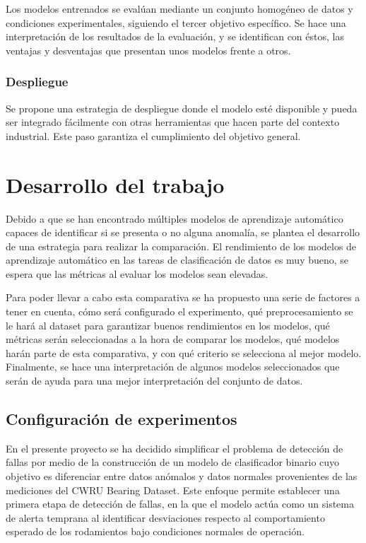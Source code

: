\documentclass[11pt,a4paper,spanish]{book}
\numberwithin{equation}{chapter}
\numberwithin{figure}{chapter}
\begin{document}
Los modelos entrenados se evalúan mediante un conjunto homogéneo de datos y condiciones 
experimentales, siguiendo el tercer objetivo específico. Se hace una interpretación de 
los resultados de la evaluación, y se identifican con éstos, las ventajas y desventajas 
que presentan unos modelos frente a otros. 


\subsection{Despliegue}

Se propone una estrategia de despliegue donde el modelo esté disponible y pueda ser 
integrado fácilmente con otras herramientas que hacen parte del contexto industrial. 
Este paso garantiza el cumplimiento del objetivo general. 



\chapter{Desarrollo del trabajo}

Debido a que se han encontrado múltiples modelos de aprendizaje automático capaces de 
identificar si se presenta o no alguna anomalía, se plantea el desarrollo de una 
estrategia para realizar la comparación. El rendimiento de los modelos de aprendizaje 
automático en las tareas de clasificación de datos es muy bueno, se espera que las 
métricas al evaluar los modelos sean elevadas. 


Para poder llevar a cabo esta comparativa se ha propuesto una serie de factores a tener 
en cuenta, cómo será configurado el experimento, qué preprocesamiento se le hará al 
dataset para garantizar buenos rendimientos en los modelos, qué métricas serán 
seleccionadas a la hora de comparar los modelos, qué modelos harán parte de esta 
comparativa, y con qué criterio se selecciona al mejor modelo. Finalmente, se hace una 
interpretación de algunos modelos seleccionados que serán de ayuda para una mejor 
interpretación del conjunto de datos. 


\section{Configuración de experimentos}

En el presente proyecto se ha decidido simplificar el problema de detección de fallas 
por medio de la construcción de un modelo de clasificador binario cuyo objetivo es 
diferenciar entre datos anómalos y datos normales provenientes de las mediciones del 
CWRU Bearing Dataset. Este enfoque permite establecer una primera etapa de detección de 
fallas, en la que el modelo actúa como un sistema de alerta temprana al identificar 
desviaciones respecto al comportamiento esperado de los rodamientos bajo condiciones 
normales de operación.
\end{document}
